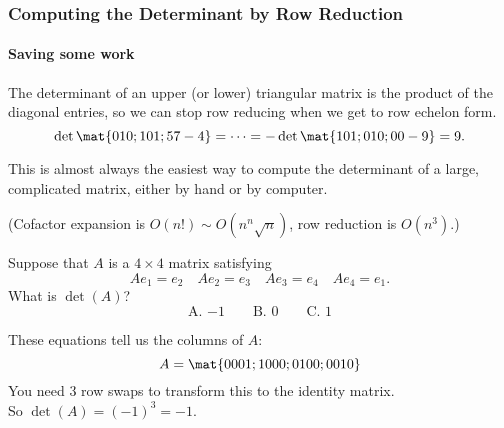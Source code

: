 \begin{frame}
\frametitle{Computing the Determinant by Row Reduction}
\framesubtitle{Saving some work}

The determinant of an upper (or lower)
triangular matrix is the product of the diagonal entries,
\pause
so we can stop row reducing when we get to row echelon form.
\pause\medskip
\[\det\mat{0 1 0; 1 0 1; 5 7 -4} = \cdots
= -\det\mat{1 0 1; 0 1 0; 0 0 -9} = 9.
\]

\vfill
\pause
\begin{bluebox}{.9\linewidth}
  This is almost always the easiest way to compute the determinant of a large,
  complicated matrix, either by hand or by computer.

  \pause\medskip
  (Cofactor expansion is $O(n!)\sim O(n^n\sqrt n)$, row reduction is $O(n^3)$.)
\end{bluebox}
\vfill

\end{frame}



\begin{pollframe}

\begin{poll}
\begin{bluebox}[Poll]{.8\linewidth}
    Suppose that $A$ is a $4\times 4$ matrix satisfying
    \[ Ae_1 = e_2 \quad Ae_2 = e_3 \quad Ae_3 = e_4 \quad Ae_4 = e_1. \]
    What is $\det(A)$?
    \[ \text{A. } {-1} \qquad \text{B. } 0 \qquad \text{C. } 1 \]
\end{bluebox}

\pause\bigskip
These equations tell us the columns of $A$:
\[ A = \mat{0 0 0 1; 1 0 0 0; 0 1 0 0; 0 0 1 0} \]
\pause
You need $3$ row swaps to transform this to the identity matrix.\\[1mm]
\pause
So $\det(A) = (-1)^3 = -1$.
\end{poll}

\end{pollframe}



